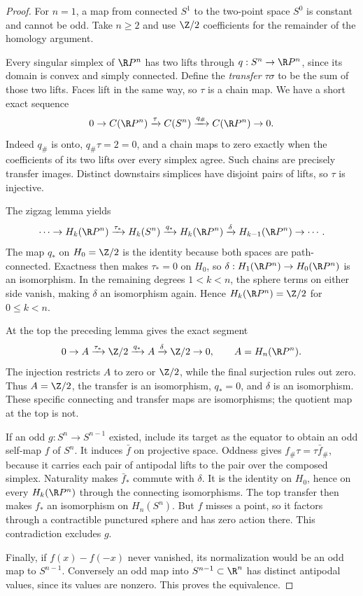 \begin{proof}
For $n=1$, a map from connected $S^1$ to the two-point space $S^0$ is constant and cannot be odd. Take $n\ge2$ and use $\Z/2$ coefficients for the remainder of the homology argument.

Every singular simplex of $\R P^n$ has two lifts through $q:S^n\to\R P^n$, since its domain is convex and simply connected. Define the \emph{transfer} $\tau\sigma$ to be the sum of those two lifts. Faces lift in the same way, so $\tau$ is a chain map. We have a short exact sequence
\[
0\to C(\R P^n)\xrightarrow{\tau}C(S^n)\xrightarrow{q_\#}C(\R P^n)\to0.
\]
Indeed $q_\#$ is onto, $q_\#\tau=2=0$, and a chain maps to zero exactly when the coefficients of its two lifts over every simplex agree. Such chains are precisely transfer images. Distinct downstairs simplices have disjoint pairs of lifts, so $\tau$ is injective.

The zigzag lemma yields
\[
\cdots\to H_k(\R P^n)\xrightarrow{\tau_*}H_k(S^n)
\xrightarrow{q_*}H_k(\R P^n)\xrightarrow{\delta}H_{k-1}(\R P^n)\to\cdots.
\]
The map $q_*$ on $H_0=\Z/2$ is the identity because both spaces are path-connected. Exactness then makes $\tau_*=0$ on $H_0$, so $\delta:H_1(\R P^n)\to H_0(\R P^n)$ is an isomorphism. In the remaining degrees $1<k<n$, the sphere terms on either side vanish, making $\delta$ an isomorphism again. Hence $H_k(\R P^n)=\Z/2$ for $0\le k<n$.

At the top the preceding lemma gives the exact segment
\[
0\to A\xrightarrow{\tau_*}\Z/2\xrightarrow{q_*}A
\xrightarrow{\delta}\Z/2\to0,\qquad A=H_n(\R P^n).
\]
The injection restricts $A$ to zero or $\Z/2$, while the final surjection rules out zero. Thus $A=\Z/2$, the transfer is an isomorphism, $q_*=0$, and $\delta$ is an isomorphism. These specific connecting and transfer maps are isomorphisms; the quotient map at the top is not.

If an odd $g:S^n\to S^{n-1}$ existed, include its target as the equator to obtain an odd self-map $f$ of $S^n$. It induces $\bar f$ on projective space. Oddness gives $f_\#\tau=\tau\bar f_\#$, because it carries each pair of antipodal lifts to the pair over the composed simplex. Naturality makes $\bar f_*$ commute with $\delta$. It is the identity on $H_0$, hence on every $H_k(\R P^n)$ through the connecting isomorphisms. The top transfer then makes $f_*$ an isomorphism on $H_n(S^n)$. But $f$ misses a point, so it factors through a contractible punctured sphere and has zero action there. This contradiction excludes $g$.

Finally, if $f(x)-f(-x)$ never vanished, its normalization would be an odd map to $S^{n-1}$. Conversely an odd map into $S^{n-1}\subset\R^n$ has distinct antipodal values, since its values are nonzero. This proves the equivalence.
\end{proof}

